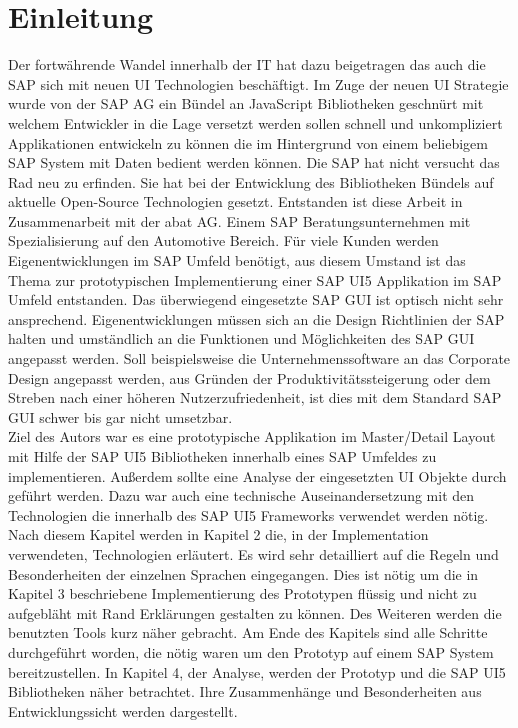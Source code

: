 \section{Einleitung}\label{einleitung}
Der fortwährende Wandel innerhalb der IT hat dazu beigetragen das auch die SAP sich mit neuen UI Technologien beschäftigt. Im Zuge der neuen UI Strategie wurde von der SAP AG ein Bündel an JavaScript Bibliotheken geschnürt mit welchem Entwickler in die Lage versetzt werden sollen schnell und unkompliziert Applikationen entwickeln zu können die im Hintergrund von einem beliebigem SAP System mit Daten bedient werden können. Die SAP hat nicht versucht das Rad neu zu erfinden. Sie hat bei der Entwicklung des Bibliotheken Bündels auf aktuelle Open-Source Technologien gesetzt. Entstanden ist diese Arbeit in Zusammenarbeit mit der abat AG. Einem SAP Beratungsunternehmen mit Spezialisierung auf den Automotive Bereich. Für viele Kunden werden Eigenentwicklungen im SAP Umfeld benötigt, aus diesem Umstand ist das Thema zur prototypischen Implementierung einer SAP UI5 Applikation im SAP Umfeld entstanden. Das überwiegend eingesetzte SAP GUI ist optisch nicht sehr ansprechend. Eigenentwicklungen müssen sich an die Design Richtlinien der SAP halten und umständlich an die Funktionen und Möglichkeiten des SAP GUI angepasst werden. Soll beispielsweise die Unternehmenssoftware an das Corporate Design angepasst werden, aus Gründen der Produktivitätssteigerung oder dem Streben nach einer höheren Nutzerzufriedenheit, ist dies mit dem Standard SAP GUI schwer bis gar nicht umsetzbar.\\
Ziel des Autors war es eine prototypische Applikation im Master/Detail Layout mit Hilfe der SAP UI5 Bibliotheken innerhalb eines SAP Umfeldes zu implementieren. Außerdem sollte eine Analyse der eingesetzten UI Objekte durch geführt werden. Dazu war auch eine technische Auseinandersetzung mit den Technologien die innerhalb des SAP UI5 Frameworks verwendet werden nötig.\\
Nach diesem Kapitel werden in Kapitel 2 die, in der Implementation verwendeten, Technologien erläutert. Es wird sehr detailliert auf die Regeln und Besonderheiten der einzelnen Sprachen eingegangen. Dies ist nötig um die in Kapitel 3 beschriebene Implementierung des Prototypen flüssig und nicht zu aufgebläht mit Rand Erklärungen gestalten zu können.  Des Weiteren werden die benutzten Tools kurz näher gebracht. Am Ende des Kapitels sind alle Schritte durchgeführt worden, die nötig waren um den Prototyp auf einem SAP System bereitzustellen. In Kapitel 4, der Analyse, werden der Prototyp und die SAP UI5 Bibliotheken näher betrachtet. Ihre Zusammenhänge und Besonderheiten aus Entwicklungssicht werden dargestellt.